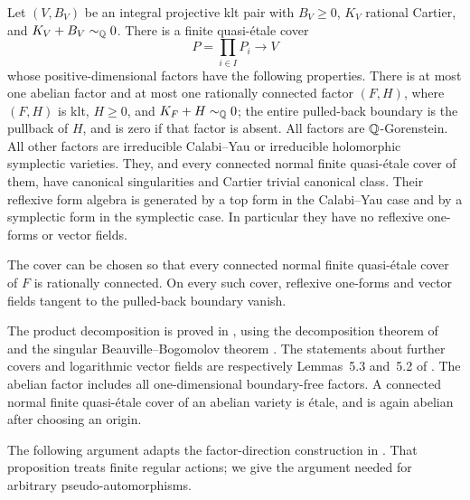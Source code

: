 \begin{externalinput}\label{char:product-input}
Let $(V,B_V)$ be an integral projective klt pair with $B_V\geq0$,
$K_V$ rational Cartier, and $K_V+B_V\sim_{\mathbb Q}0$.  There is a finite
quasi-\'etale cover
\[
                  P=\prod_{i\in I}P_i\longrightarrow V
\]
whose positive-dimensional factors have the following properties.
There is at most one abelian factor and at most one rationally
connected factor $(F,H)$, where $(F,H)$ is klt, $H\geq0$, and
$K_F+H\sim_{\mathbb Q}0$; the entire pulled-back boundary is the pullback
of $H$, and is zero if that factor is absent.  All factors are
$\mathbb Q$-Gorenstein.  All other factors are
irreducible Calabi--Yau or
irreducible holomorphic symplectic varieties.  They, and every
connected normal finite quasi-\'etale cover of them, have canonical
singularities and Cartier trivial canonical class.  Their reflexive
form algebra is generated by a top form in the Calabi--Yau case and
by a symplectic form in the symplectic case.  In particular they have
no reflexive one-forms or vector fields.

The cover can be chosen so that every connected normal finite
quasi-\'etale cover of $F$ is rationally connected.  On every such
cover, reflexive one-forms and vector fields tangent to the
pulled-back boundary vanish.
\end{externalinput}

The product decomposition is proved in
\citet[Proposition~5.1]{LOGI}, using
the decomposition theorem of
\citet[Theorem~1.3]{MatsumuraWang2025} and the singular
Beauville--Bogomolov theorem
\citep[Definition~1.4 and Theorem~1.5]{HoringPeternell2019}.  The statements about
further covers and logarithmic vector fields are respectively
Lemmas~5.3 and~5.2 of \citet{LOGI}.  The abelian factor includes
all one-dimensional boundary-free factors.  A connected normal
finite quasi-\'etale cover of an abelian variety is \'etale, and is
again abelian after choosing an origin.

The following argument adapts the factor-direction construction in
\citet[Proposition~5.4]{LOGI}.  That proposition treats finite regular actions;
we give the argument needed for arbitrary pseudo-automorphisms.

